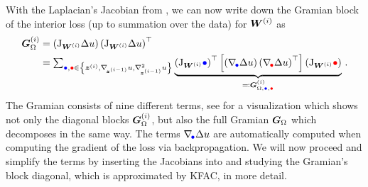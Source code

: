 With the Laplacian's Jacobian from , we can now write down the Gramian block of the interior loss (up to summation over the data) for ${\bm{W}}^{(i)}$ as
\begin{align}\label{eq:fisher}
  \begin{split}
    {\bm{G}}_{\Omega}^{(i)}
    &=
      \left(
      \mathrm{J}_{{\bm{W}}^{(i)}} \Delta u
      \right)
      \left(
      \mathrm{J}_{{\bm{W}}^{(i)}} \Delta u
      \right)^{\top}
    \\
    &=
      \textstyle
      \sum_{\textcolor{blue}{\bullet}, \textcolor{red}{\bullet} \in \left\{ {\bm{z}}^{(i)}, \nabla_{\!{{\bm{z}}^{(i-1)}}}u, \nabla_{\!{{\bm{z}}^{(i-1)}}}^{2}u \right\}}
      \underbrace{
      \left(
      \mathrm{J}_{{\bm{W}}^{(i)}}\textcolor{blue}{\bullet}
      \right)^{\top}
      \left[
      \left(
      \nabla_{\!{\textcolor{blue}{\bullet}}}\Delta u
      \right)
      \left(
      \nabla_{\!{\textcolor{red}{\bullet}}}\Delta u
      \right)^{\top}
      \right]
      \left(
      \mathrm{J}_{{\bm{W}}^{(i)}}\textcolor{red}{\bullet}
      \right)}_{
      \eqqcolon {\bm{G}}_{\Omega,\textcolor{blue}{\bullet}, \textcolor{red}{\bullet}}^{(i)}
      }\,.
  \end{split}
\end{align}
The Gramian consists of nine different terms, see  for a visualization which shows not only the diagonal blocks ${\bm{G}}_{\Omega}^{(i)}$, but also the full Gramian ${\bm{G}}_{\Omega}$ which decomposes in the same way.
The terms $\nabla_{\!{\textcolor{blue}{\bullet}}}\Delta u$ are automatically computed when computing the gradient of the loss via backpropagation.
We will now proceed and simplify the terms by inserting the Jacobians into  and studying the Gramian's block diagonal, which is approximated by KFAC, in more detail.



